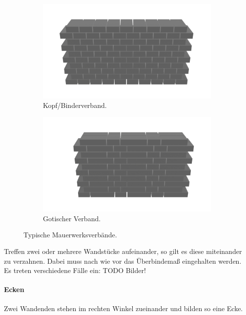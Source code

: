 \begin{figure}[h!]
\begin{subfigure}[b]{0.5\columnwidth}
  \end{subfigure}
  \begin{subfigure}[b]{0.5\columnwidth}
    \includegraphics[width=\columnwidth]{fig/kopfverband.png}
    \caption{Kopf/Binderverband.}
    \label{fig:basics:läuferverband_mittig}
  \end{subfigure}
  \begin{subfigure}[b]{0.5\columnwidth}
    \includegraphics[width=\columnwidth]{fig/gotischerverband.png}
    \caption{Gotischer Verband.}
    \label{fig:basics:läuferverband_schleppend}
  \end{subfigure}
  \label{fig:verbände}
  \caption{Typische Mauerwerksverbände.}
\end{figure}

Treffen zwei oder mehrere Wandstücke aufeinander, so gilt es diese miteinander zu verzahnen.
Dabei muss nach wie vor das Überbindemaß eingehalten werden.
Es treten verschiedene Fälle ein: TODO Bilder!
\paragraph{Ecken}
Zwei Wandenden stehen im rechten Winkel zueinander und bilden so eine Ecke.

